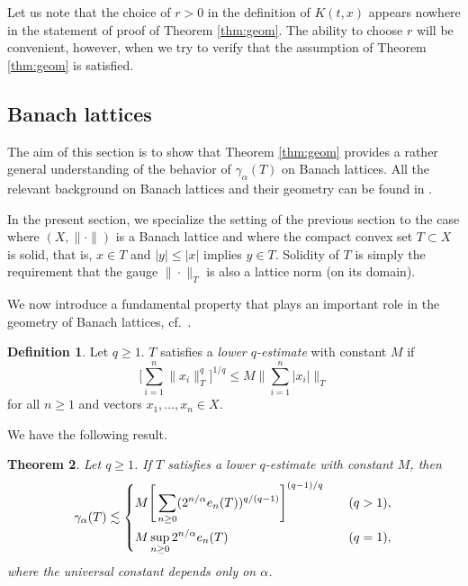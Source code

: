 \documentclass[10pt,reqno]{amsart}
\newtheorem{thm}{Theorem}[section]
\theoremstyle{definition}
\newtheorem{defn}[thm]{Definition}
\numberwithin{equation}{section}
\numberwithin{figure}{section}
\numberwithin{table}{section}
\begin{document}
Let us note that the choice of $r>0$ in the definition of $K(t,x)$ appears 
nowhere in the statement of proof of Theorem \ref{thm:geom}. The ability 
to choose $r$ will be convenient, however, when we try to verify that the 
assumption of Theorem \ref{thm:geom} is satisfied.

\subsection{Banach lattices}
\label{sec:lattice}

The aim of this section is to show that Theorem \ref{thm:geom} provides a 
rather general understanding of the behavior of $\gamma_\alpha(T)$ on 
Banach lattices. All the relevant background on Banach lattices and their 
geometry can be found in \cite{LT79}.

In the present section, we specialize the setting of the previous section 
to the case where $(X,\|\cdot\|)$ is a Banach lattice and where the 
compact convex set $T\subset X$ is solid, that is, $x\in T$ and $|y|\le 
|x|$ implies $y\in T$. Solidity of $T$ is simply the requirement that 
the gauge $\|\cdot\|_T$ is also a lattice norm (on its domain).

We now introduce a fundamental property that plays an important role in 
the geometry of Banach lattices, cf.\ \cite[section 1.f]{LT79}.

\begin{defn}
Let $q\ge 1$. $T$ satisfies a \emph{lower 
$q$-estimate} with constant $M$ if
$$
	\Bigg[\sum_{i=1}^n\|x_i\|_T^q\Bigg]^{1/q} \le
	M\Bigg\|\sum_{i=1}^n |x_i|\Bigg\|_T
$$
for all $n\ge 1$ and vectors $x_1,\ldots,x_n\in X$.
\end{defn}

We have the following result.

\begin{thm}
\label{thm:lattice}
Let $q\ge 1$. If $T$ satisfies a lower $q$-estimate with constant $M$, 
then
$$
	\gamma_\alpha(T)\lesssim
	\begin{dcases}
	M\Bigg[\sum_{n\ge 0}(2^{n/\alpha}e_n(T))^{q/(q-1)}\Bigg]^{(q-1)/q}
	&\quad (q>1),\\
	M\sup_{n\ge 0}2^{n/\alpha}e_n(T)&\quad(q=1),
	\end{dcases}
$$
where the universal constant depends only on $\alpha$.
\end{thm}
\end{document}
